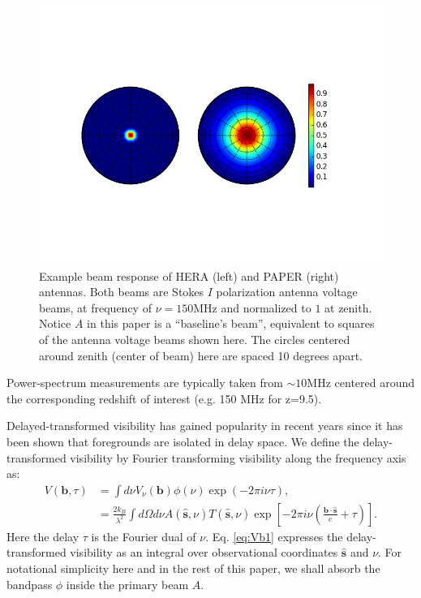 \documentclass[twocolumn,apj,numberedappendix]{emulateapj}
\renewcommand\[{\begin{equation}}
\renewcommand\]{\end{equation}}
\begin{document}
\begin{figure}[H]
\includegraphics[width=1.2\linewidth]{Beams}

\caption{Example beam response of HERA (left) and PAPER (right) antennas. Both beams are Stokes $I$ polarization antenna voltage beams, at frequency of $\nu=150\text{MHz}$ and normalized to $1$ at zenith. Notice $A$ in this paper is a ``baseline's beam'', equivalent to squares of the antenna voltage beams shown here. The circles centered around zenith (center of beam) here are
spaced 10 degrees apart. \label{fig:Beam}}
\end{figure}

Power-spectrum measurements are typically taken from $\sim10$MHz centered around the corresponding redshift of interest (e.g. 150 MHz for z=9.5). 

Delayed-transformed visibility has gained popularity in recent years since it has been shown that foregrounds are isolated in delay space. We define the delay-transformed visibility by Fourier transforming visibility along the frequency axis \citep{delay-transform} as:
\small
\begin{equation}
\begin{aligned}V(\boldsymbol{b},\tau) & =\int d\nu V_{\nu}(\boldsymbol{b})\phi(\nu)\exp\left(-2\pi i\nu\tau\right),\\
 & =\frac{2k_{B}}{\lambda^{2}}\int d\Omega d\nu A(\hat{\boldsymbol{s}},\nu)T(\hat{\boldsymbol{s}},\nu)\exp\left[-2\pi i\nu\left(\frac{\boldsymbol{b}\cdot\hat{\boldsymbol{s}}}{c}+\tau\right)\right]. 
\end{aligned}
\label{eq:Vb1}
\end{equation}
\normalsize
Here the delay $\tau$ is the Fourier dual of $\nu$. Eq. \eqref{eq:Vb1} expresses the delay-transformed visibility as
an integral over observational coordinates $\hat{\boldsymbol{s}}$ and $\nu$. For notational simplicity here and in the rest of this paper, we shall absorb the bandpass $\phi$ inside the primary beam $A$.  
\end{document}

